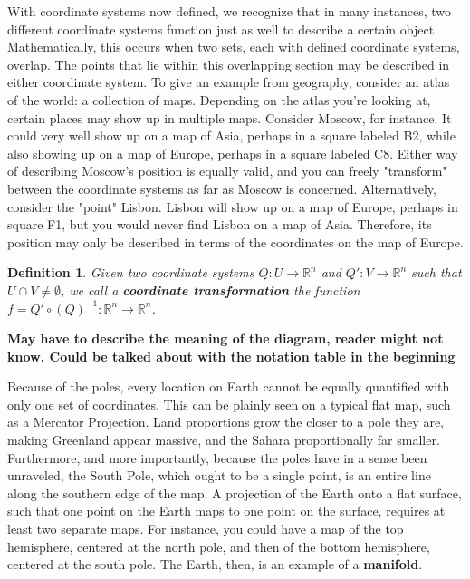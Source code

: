 \documentclass{book}
\newtheorem{defn}[equation]{Definition}
\begin{document}
With coordinate systems now defined, we recognize that in many instances, two different coordinate systems function just as well to describe a certain object. Mathematically, this occurs when two sets, each with defined coordinate systems, overlap. The points that lie within this overlapping section may be described in either coordinate system. To give an example from geography, consider an atlas of the world: a collection of maps. Depending on the atlas you're looking at, certain places may show up in multiple maps. Consider Moscow, for instance. It could very well show up on a map of Asia, perhaps in a square labeled B2, while also showing up on a map of Europe, perhaps in a square labeled C8. Either way of describing Moscow's position is equally valid, and you can freely "transform" between the coordinate systems as far as Moscow is concerned. Alternatively, consider the "point" Lisbon. Lisbon will show up on a map of Europe, perhaps in square F1, but you would never find Lisbon on a map of Asia. Therefore, its position may only be described in terms of the coordinates on the map of Europe.


\begin{defn}
	Given two coordinate systems  $Q : U \to \mathbb{R}^n$ and $Q' : V \to \mathbb{R}^n$ such that $U \cap V \neq \emptyset$, we call a \textbf{coordinate transformation} the function $f = Q' \circ (Q)^{-1} : \mathbb{R}^n \to \mathbb{R}^n$.
\end{defn}



\textbf{May have to describe the meaning of the diagram, reader might not know. Could be talked about with the notation table in the beginning}



\begin{center}
\end{center}


Because of the poles, every location on Earth cannot be equally quantified with only one set of coordinates. This can be plainly seen on a typical flat map, such as a Mercator Projection. Land proportions grow the closer to a pole they are, making Greenland appear massive, and the Sahara proportionally far smaller. Furthermore, and more importantly, because the poles have in a sense been unraveled, the South Pole, which ought to be a single point, is an entire line along the southern edge of the map. A projection of the Earth onto a flat surface, such that one point on the Earth maps to one point on the surface, requires at least two separate maps. For instance, you could have a map of the top hemisphere, centered at the north pole, and then of the bottom hemisphere, centered at the south pole. The Earth, then, is an example of a \textbf{manifold}. 
\end{document}
